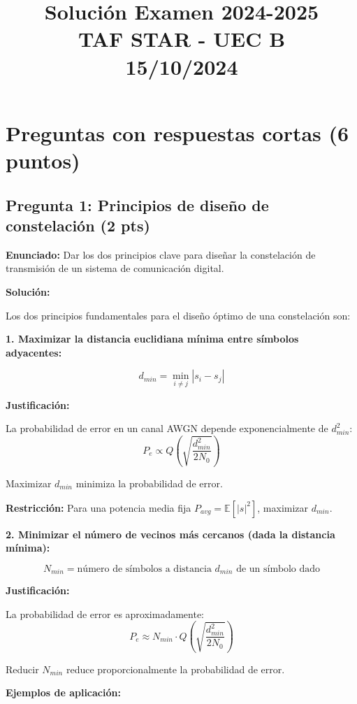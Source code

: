 \documentclass[11pt,a4paper]{article}
\title{\textbf{Soluci\'on Examen 2024-2025\\TAF STAR - UEC B\\15/10/2024}}
\author{}
\date{}
\begin{document}
\maketitle

\section*{Preguntas con respuestas cortas (6 puntos)}

\subsection*{Pregunta 1: Principios de dise\~no de constelaci\'on (2 pts)}

\textbf{Enunciado:} Dar los dos principios clave para dise\~nar la constelaci\'on de transmisi\'on de un sistema de comunicaci\'on digital.

\vspace{0.3cm}
\textbf{Soluci\'on:}

Los dos principios fundamentales para el dise\~no \'optimo de una constelaci\'on son:

\textbf{1. Maximizar la distancia euclidiana m\'inima entre s\'imbolos adyacentes:}

\[
\boxed{d_{min} = \min_{i \neq j} |s_i - s_j|}
\]

\textbf{Justificaci\'on:} 

La probabilidad de error en un canal AWGN depende exponencialmente de $d_{min}^2$:
\[
P_e \propto Q\left(\sqrt{\frac{d_{min}^2}{2N_0}}\right)
\]

Maximizar $d_{min}$ minimiza la probabilidad de error.

\textbf{Restricci\'on:} Para una potencia media fija $P_{avg} = \mathbb{E}[|s|^2]$, maximizar $d_{min}$.

\textbf{2. Minimizar el n\'umero de vecinos m\'as cercanos (dada la distancia m\'inima):}

\[
\boxed{N_{min} = \text{n\'umero de s\'imbolos a distancia } d_{min} \text{ de un s\'imbolo dado}}
\]

\textbf{Justificaci\'on:}

La probabilidad de error es aproximadamente:
\[
P_e \approx N_{min} \cdot Q\left(\sqrt{\frac{d_{min}^2}{2N_0}}\right)
\]

Reducir $N_{min}$ reduce proporcionalmente la probabilidad de error.

\textbf{Ejemplos de aplicaci\'on:}
\end{document}
